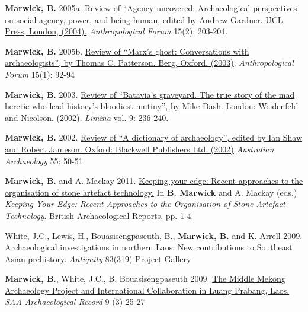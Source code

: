 \documentclass[11pt,article,oneside]{memoir}
\begin{document}
\ind \textbf{Marwick, B.} 2005a. \href{http://faculty.washington.edu/bmarwick/PDFs/Uncovered.pdf}{Review of “Agency uncovered: Archaeological perspectives on social agency, power, and being human, edited by Andrew Gardner. UCL Press, London, (2004).} \textit{Anthropological Forum} 15(2): 203-204.

\ind \textbf{Marwick, B.} 2005b. \href{http://faculty.washington.edu/bmarwick/PDFs/Ghosts.pdf}{Review of “Marx’s ghost: Conversations with archaeologists”, by Thomas C. Patterson. Berg, Oxford. (2003)}. \textit{Anthropological Forum} 15(1): 92-94

\ind \textbf{Marwick, B.} 2003. \href{http://faculty.washington.edu/bmarwick/PDFs/Batavia.pdf}{Review of “Batavia’s graveyard. The true story of the mad heretic who lead history’s bloodiest mutiny”, by Mike Dash.} London: Weidenfeld and Nicolson. (2002). \textit{Limina} vol. 9: 236-240.

\ind \textbf{Marwick, B.} 2002. \href{http://faculty.washington.edu/bmarwick/PDFs/Marwick_2002_Dictionary.pdf}{Review of “A dictionary of archaeology”, edited by Ian Shaw and Robert Jameson. Oxford: Blackwell Publishers Ltd. (2002)} \textit{Australian Archaeology} 55: 50-51

\bigskip


\ind \textbf{Marwick, B.} and A. Mackay 2011. \href{http://faculty.washington.edu/bmarwick/PDFs/Marwick_and_Mackay_2011_intro.pdf}{Keeping your edge: Recent approaches to the organisation of stone artefact technology.} In \textbf{B. Marwick} and A. Mackay (eds.) \textit{Keeping Your Edge: Recent Approaches to the Organisation of Stone Artefact Technology}. British Archaeological Reports.  pp. 1-4.

\ind White, J.C., Lewis, H., Bouasisengpaseuth, B., \textbf{Marwick, B.} and K. Arrell 2009. \href{http://faculty.washington.edu/bmarwick/PDFs/White_et_al_2009_Antiquity.pdf}{Archaeological investigations in northern Laos: New contributions to Southeast Asian prehistory.} \textit{Antiquity} 83(319) Project Gallery

\ind \textbf{Marwick, B.}, White, J.C., B. Bouasisengpaseuth 2009. \href{http://faculty.washington.edu/bmarwick/PDFs/Marwick_et_al_2009_MMAP.pdf}{The Middle Mekong Archaeology Project and International Collaboration in Luang Prabang, Laos.} \textit{SAA Archaeological Record} 9 (3) 25-27
\end{document}
